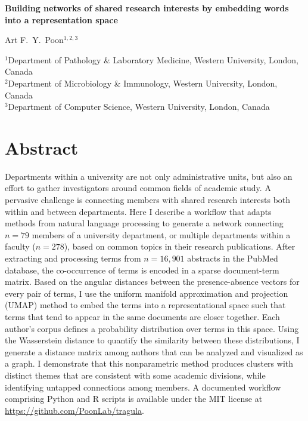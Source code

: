 \documentclass[12pt]{article}
\begin{document}
\doublespacing

\begin{flushleft}
{\large\bf Building networks of shared research interests by embedding words into a representation space}

{Art F.~Y.~Poon$^{1,2,3}$}

$^1$Department of Pathology \& Laboratory Medicine, Western University, London, Canada\\
$^2$Department of Microbiology \& Immunology, Western University, London, Canada\\
$^3$Department of Computer Science, Western University, London, Canada\\

\end{flushleft}



\section * {Abstract}

Departments within a university are not only administrative units, but also an effort to gather investigators around common fields of academic study.
A pervasive challenge is connecting members with shared research interests both within and between departments. 
Here I describe a workflow that adapts methods from natural language processing to generate a network connecting $n=79$ members of a university department, or multiple departments within a faculty ($n=278$), based on common topics in their research publications.
After extracting and processing terms from $n=16,901$ abstracts in the PubMed database, the co-occurrence of terms is encoded in a sparse document-term matrix.
Based on the angular distances between the presence-absence vectors for every pair of terms, I use the uniform manifold approximation and projection (UMAP) method to embed the terms into a representational space such that terms that tend to appear in the same documents are closer together.
Each author's corpus defines a probability distribution over terms in this space.
Using the Wasserstein distance to quantify the similarity between these distributions, I generate a distance matrix among authors that can be analyzed and visualized as a graph.
I demonstrate that this nonparametric method produces clusters with distinct themes that are consistent with some academic divisions, while identifying untapped connections among members.
A documented workflow comprising Python and R scripts is available under the MIT license at \url{https://github.com/PoonLab/tragula}.
\end{document}
